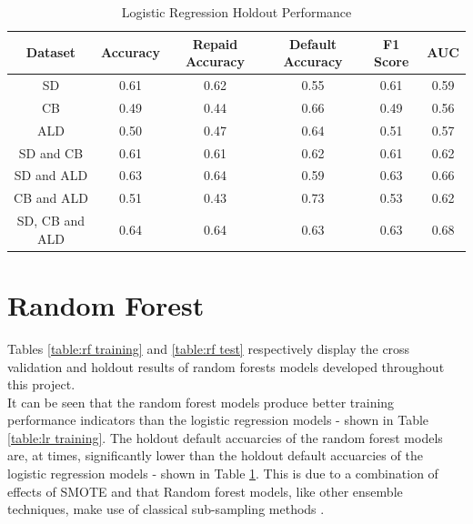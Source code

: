 \begin{table}[H]
\begin{center}
\begin{tabular}{|c|c|c|c|c|c|} 
\hline
\multicolumn{1}{|c|}{Dataset}
&\multicolumn{1}{|c|}{Accuracy}
&\multicolumn{1}{|c|}{Repaid Accuracy}
&\multicolumn{1}{|c|}{Default Accuracy}
&\multicolumn{1}{|c|}{F1 Score}
&\multicolumn{1}{|c|}{AUC}\\
\hline
SD & 0.61 & 0.62 & 0.55 & 0.61 & 0.59    \\
\hline
CB & 0.49 & 0.44 & 0.66 & 0.49 & 0.56    \\
\hline
ALD & 0.50 & 0.47 & 0.64 & 0.51 & 0.57    \\
\hline
SD and CB & 0.61 & 0.61 & 0.62 & 0.61 & 0.62    \\
\hline
SD and ALD & 0.63 & 0.64 & 0.59 & 0.63 & 0.66    \\
\hline
CB and ALD & 0.51 & 0.43 & 0.73 & 0.53 & 0.62    \\
\hline
SD, CB and ALD & 0.64 & 0.64 & 0.63 & 0.63 & 0.68    \\
\hline
\end{tabular}
\end{center}
\caption{Logistic Regression Holdout Performance}
\label{table:lr test}
\end{table}

\vspace{10pt}



\section{Random Forest}

Tables \ref{table:rf training} and \ref{table:rf test} respectively display the cross validation and holdout results of random forests models developed throughout this project. \\

It can be seen that the random forest models produce better training performance indicators than the logistic regression models - shown in Table \ref{table:lr training}. The holdout default accuarcies of the random forest models are, at times, significantly  lower than the holdout default accuarcies of the logistic regression models - shown in Table \ref{table:lr test}. This is due to a combination of effects of SMOTE and that Random forest models, like other ensemble techniques, make use of classical sub-sampling methods \parencite{Minority}. \\

